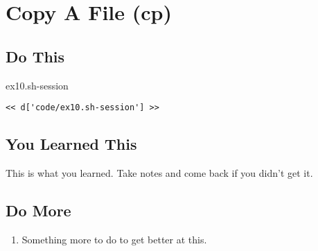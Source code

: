 \chapter{Copy A File (cp)}

\section{Do This}

\begin{code}{ex10.sh-session}
\begin{Verbatim}
<< d['code/ex10.sh-session'] >>
\end{Verbatim}
\end{code}


\section{You Learned This}

This is what you learned.  Take notes and come back if you didn't get it.

\section{Do More}

\begin{enumerate}
\item Something more to do to get better at this.
\end{enumerate}

